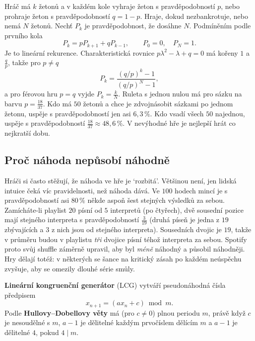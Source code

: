 \begin{example}
  Hráč má $k$ žetonů a v každém kole vyhraje žeton s pravděpodobností $p$, nebo prohraje žeton s pravděpodobností $q = 1 - p$. Hraje, dokud nezbankrotuje, nebo nemá $N$ žetonů. Nechť $P_k$ je pravděpodobnost, že dosáhne $N$. Podmíněním podle prvního kola
  \begin{equation*}
    P_k = pP_{k+1} + qP_{k-1},\qquad P_0 = 0,\quad P_N = 1.
  \end{equation*}
  Je to lineární rekurence. Charakteristická rovnice $p\lambda^2 - \lambda + q = 0$ má kořeny $1$ a $\frac{q}{p}$, takže pro $p\neq q$
  \begin{equation*}
    P_k = \frac{(q/p)^k - 1}{(q/p)^N - 1},
  \end{equation*}
  a pro férovou hru $p = q$ vyjde $P_k = \frac{k}{N}$. Ruleta s jednou nulou má pro sázku na barvu $p = \frac{18}{37}$. Kdo má $50$ žetonů a chce je zdvojnásobit sázkami po jednom žetonu, uspěje s pravděpodobností jen asi $6{,}3\,\%$. Kdo vsadí všech $50$ najednou, uspěje s pravděpodobností $\frac{18}{37}\approx 48{,}6\,\%$. V nevýhodné hře je nejlepší hrát co nejkratší dobu.
\end{example}

\subsection{Proč náhoda nepůsobí náhodně}

Hráči si často stěžují, že náhoda ve hře je `rozbitá'. Většinou není, jen lidská intuice čeká víc pravidelnosti, než náhoda dává. Ve $100$ hodech mincí je s pravděpodobností asi $80\,\%$ někde aspoň šest stejných výsledků za sebou. Zamícháte-li playlist $20$ písní od $5$ interpretů (po čtyřech), dvě sousední pozice mají stejného interpreta s pravděpodobností $\frac{3}{19}$ (druhá píseň je jedna z $19$ zbývajících a $3$ z nich jsou od stejného interpreta). Sousedních dvojic je $19$, takže v průměru budou v playlistu \textit{tři} dvojice písní téhož interpreta za sebou. Spotify proto svůj shuffle záměrně upravil, aby byl \textit{méně} náhodný a působil náhodněji. Hry dělají totéž: v některých se šance na kritický zásah po každém neúspěchu zvyšuje, aby se omezily dlouhé série smůly.

\begin{definitionbox}
  \textbf{Lineární kongruenční generátor} (LCG) vytváří pseudonáhodná čísla předpisem
  \begin{equation*}
    x_{n+1} = (ax_n + c)\bmod m.
  \end{equation*}
  Podle \textbf{Hullovy--Dobellovy věty} má (pro $c\neq 0$) plnou periodu $m$, právě když $c$ je nesoudělné s $m$, $a - 1$ je dělitelné každým prvočíslem dělícím $m$ a $a - 1$ je dělitelné $4$, pokud $4\mid m$.
\end{definitionbox}

